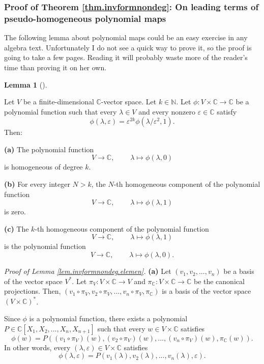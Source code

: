 \documentclass
[numbers=enddot,12pt,final,onecolumn,german,notitlepage]{scrartcl}%
\theoremstyle{definition}
\newtheorem{lem}[theo]{Lemma}
\newenvironment{lemma}[1][]
{\begin{lem}[#1]\begin{leftbar}}
{\end{leftbar}\end{lem}}
\begin{document}
\subsubsection{Proof of Theorem \ref{thm.invformnondeg}: On leading terms of
pseudo-homogeneous polynomial maps}

The following lemma about polynomial maps could be an easy exercise in any
algebra text. Unfortunately I do not see a quick way to prove it, so the proof
is going to take a few pages. Reading it will probably waste more of the
reader's time than proving it on her own.

\begin{lemma}
\label{lem.invformnondeg.elemen}Let $V$ be a finite-dimensional $\mathbb{C}%
$-vector space. Let $k\in\mathbb{N}$. Let $\phi:V\times\mathbb{C}%
\rightarrow\mathbb{C}$ be a polynomial function such that every $\lambda\in V$
and every nonzero $\varepsilon\in\mathbb{C}$ satisfy%
\[
\phi\left(  \lambda,\varepsilon\right)  =\varepsilon^{2k}\phi\left(
\lambda/\varepsilon^{2},1\right)  .
\]
Then:

\textbf{(a)} The polynomial function
\[
V\rightarrow\mathbb{C},\ \ \ \ \ \ \ \ \ \ \lambda\mapsto\phi\left(
\lambda,0\right)
\]
is homogeneous of degree $k$.

\textbf{(b)} For every integer $N>k$, the $N$-th homogeneous component of the
polynomial function%
\[
V\rightarrow\mathbb{C},\ \ \ \ \ \ \ \ \ \ \lambda\mapsto\phi\left(
\lambda,1\right)
\]
is zero.

\textbf{(c)} The $k$-th homogeneous component of the polynomial function%
\[
V\rightarrow\mathbb{C},\ \ \ \ \ \ \ \ \ \ \lambda\mapsto\phi\left(
\lambda,1\right)
\]
is the polynomial function%
\[
V\rightarrow\mathbb{C},\ \ \ \ \ \ \ \ \ \ \lambda\mapsto\phi\left(
\lambda,0\right)  .
\]

\end{lemma}

\textit{Proof of Lemma \ref{lem.invformnondeg.elemen}.} \textbf{(a)} Let
$\left(  v_{1},v_{2},...,v_{n}\right)  $ be a basis of the vector space
$V^{\ast}$. Let $\pi_{V}:V\times\mathbb{C}\rightarrow V$ and $\pi_{\mathbb{C}%
}:V\times\mathbb{C}\rightarrow\mathbb{C}$ be the canonical projections. Then,
$\left(  v_{1}\circ\pi_{V},v_{2}\circ\pi_{V},...,v_{n}\circ\pi_{V}%
,\pi_{\mathbb{C}}\right)  $ is a basis of the vector space $\left(
V\times\mathbb{C}\right)  ^{\ast}$.

Since $\phi$ is a polynomial function, there exists a polynomial
$P\in\mathbb{C}\left[  X_{1},X_{2},...,X_{n},X_{n+1}\right]  $ such that every
$w\in V\times\mathbb{C}$ satisfies%
\[
\phi\left(  w\right)  =P\left(  \left(  v_{1}\circ\pi_{V}\right)  \left(
w\right)  ,\left(  v_{2}\circ\pi_{V}\right)  \left(  w\right)  ,...,\left(
v_{n}\circ\pi_{V}\right)  \left(  w\right)  ,\pi_{\mathbb{C}}\left(  w\right)
\right)  .
\]
In other words, every $\left(  \lambda,\varepsilon\right)  \in V\times
\mathbb{C}$ satisfies%
\begin{equation}
\phi\left(  \lambda,\varepsilon\right)  =P\left(  v_{1}\left(  \lambda\right)
,v_{2}\left(  \lambda\right)  ,...,v_{n}\left(  \lambda\right)  ,\varepsilon
\right)  . \label{pf.invformnondeg.elemen.1}%
\end{equation}
\end{document}
